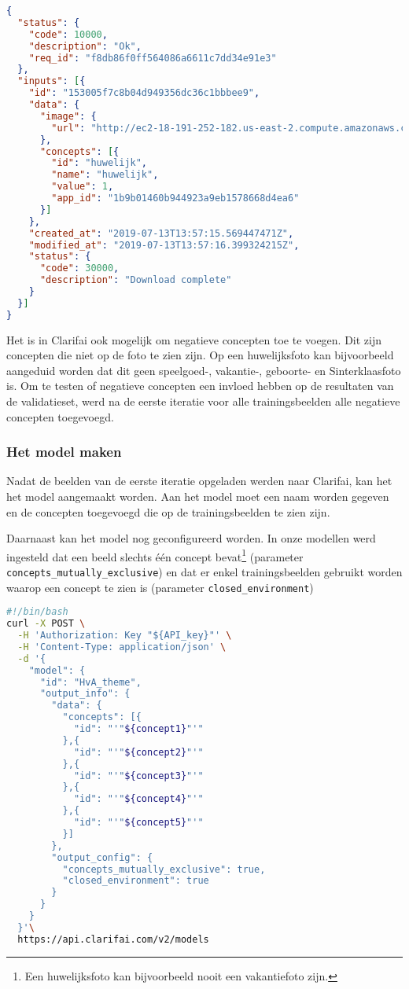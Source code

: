 \begin{lstlisting}[language=json,caption=Het antwoord van de Computer Vision API in JSON na het opladen van een beeld met een concept]
{
  "status": {
    "code": 10000,
    "description": "Ok",
    "req_id": "f8db86f0ff564086a6611c7dd34e91e3"
  },
  "inputs": [{
    "id": "153005f7c8b04d949356dc36c1bbbee9",
    "data": {
      "image": {
        "url": "http://ec2-18-191-252-182.us-east-2.compute.amazonaws.com:8182/iiif/2/2003-036-018/full/922,/0/default.jpg"
      },
      "concepts": [{
        "id": "huwelijk",
        "name": "huwelijk",
        "value": 1,
        "app_id": "1b9b01460b944923a9eb1578668d4ea6"
      }]
    },
    "created_at": "2019-07-13T13:57:15.569447471Z",
    "modified_at": "2019-07-13T13:57:16.399324215Z",
    "status": {
      "code": 30000,
      "description": "Download complete"
    }
  }]
}
\end{lstlisting}

Het is in Clarifai ook mogelijk om negatieve concepten toe te voegen. Dit zijn concepten die niet op de foto te zien zijn. Op een huwelijksfoto kan bijvoorbeeld aangeduid worden dat dit geen speelgoed-, vakantie-, geboorte- en Sinterklaasfoto is. Om te testen of negatieve concepten een invloed hebben op de resultaten van de validatieset, werd na de eerste iteratie voor alle trainingsbeelden alle negatieve concepten toegevoegd.

\subsubsection{Het model maken}
\label{subsubsec:model-maken}

Nadat de beelden van de eerste iteratie opgeladen werden naar Clarifai, kan het  het model aangemaakt worden. Aan het model moet een naam worden gegeven en de concepten toegevoegd die op de trainingsbeelden te zien zijn. 

Daarnaast kan het model nog geconfigureerd worden. In onze modellen werd ingesteld dat een beeld slechts één concept bevat\footnote{Een huwelijksfoto kan bijvoorbeeld nooit een vakantiefoto zijn.} (parameter \texttt{concepts\_mutually\_exclusive}) en dat er enkel trainingsbeelden gebruikt worden waarop een concept te zien is (parameter \texttt{closed\_environment})

\begin{lstlisting}[language=bash,caption=bash commando om een custom model met vijf concepten te creëren]
#!/bin/bash
curl -X POST \
  -H 'Authorization: Key "${API_key}"' \
  -H 'Content-Type: application/json' \
  -d '{
    "model": {
      "id": "HvA_theme",
      "output_info": {
        "data": {
          "concepts": [{
            "id": "'"${concept1}"'"
          },{
            "id": "'"${concept2}"'"
          },{
            "id": "'"${concept3}"'"
          },{
            "id": "'"${concept4}"'"
          },{
            "id": "'"${concept5}"'"
          }]
        },
        "output_config": {
          "concepts_mutually_exclusive": true,
          "closed_environment": true
        }
      }
    }
  }'\
  https://api.clarifai.com/v2/models
\end{lstlisting}

